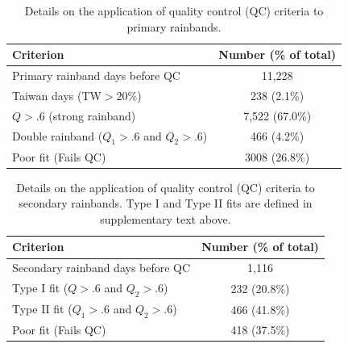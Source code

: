 \documentclass[final,grl]{agutexSI}
\begin{document}
\begin{table}

\caption{Details on the application of quality control (QC) criteria to primary rainbands.}
\centering

\begin{tabular}{ l c}
	 Criterion & Number (\% of total) \\
	 \hline
	 Primary rainband days before QC & 11,228 \\
	 Taiwan days (TW$>20\%$) & 238 (2.1\%) \\
	 $Q>.6$ (strong rainband) & 7,522 (67.0\%) \\
	 Double rainband ($Q_1>.6$ and $Q_2>.6$) & 466 (4.2\%) \\
	 Poor fit (Fails QC) & 3008 (26.8\%) \\
	 
\end{tabular}
\label{ts2}
\end{table}

\begin{table}

\caption{Details on the application of quality control (QC) criteria to secondary rainbands. Type I and Type II fits are defined in supplementary text above.}
\centering

\begin{tabular}{ l c}
	 Criterion & Number (\% of total) \\
	 \hline
	 Secondary rainband days before QC & 1,116 \\
	 Type I fit ($Q>.6$ and $Q_2>.6$) & 232 (20.8\%) \\
	 Type II fit ($Q_1>.6$ and $Q_2>.6$) & 466 (41.8\%) \\
	 Poor fit (Fails QC) & 418 (37.5\%) \\
	 
\end{tabular}
\label{ts3}
\end{table}
\end{document}

